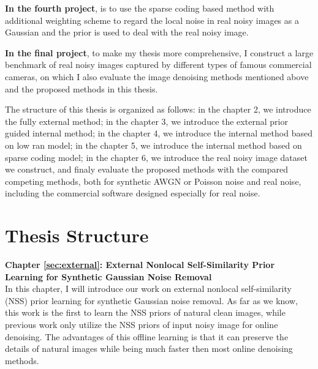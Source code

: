 \textbf{In the fourth project},  is to use the sparse coding based method with additional weighting scheme to regard the local noise in real noisy images as a Gaussian and the prior is used to deal with the real noisy image.


\textbf{In the final project}, to make my thesis more comprehensive, I construct a large benchmark of real noisy images captured by different types of famous commercial cameras, on which I also evaluate the image denoising methods mentioned above and the proposed methods in this thesis. 


The structure of this thesis is organized as follows: in the chapter 2, we introduce the fully external method; in the chapter 3, we introduce the external prior guided internal method; in the chapter 4, we introduce the internal method based on low ran model; in the chapter 5, we introduce the internal method based on sparse coding model; in the chapter 6, we introduce the real noisy image dataset we construct, and finaly evaluate the proposed methods with the compared competing methods, both for synthetic AWGN or Poisson noise and real noise, including the commercial software designed especially for real noise. 


\section{Thesis Structure}
\label{sec:intro:structure}






\textbf{Chapter \ref{sec:external}: External Nonlocal Self-Similarity Prior Learning for Synthetic Gaussian Noise Removal} \\[0.2em]

In this chapter, I will introduce our work on external nonlocal self-similarity (NSS) prior learning for synthetic Gaussian noise removal. As far as we know, this work is the first to learn the NSS priors of natural clean images, while previous work only utilize the NSS priors of input noisy image for online denoising. The advantages of this offline learning is that it can preserve the details of natural images while being much faster then most online denoising methods.


